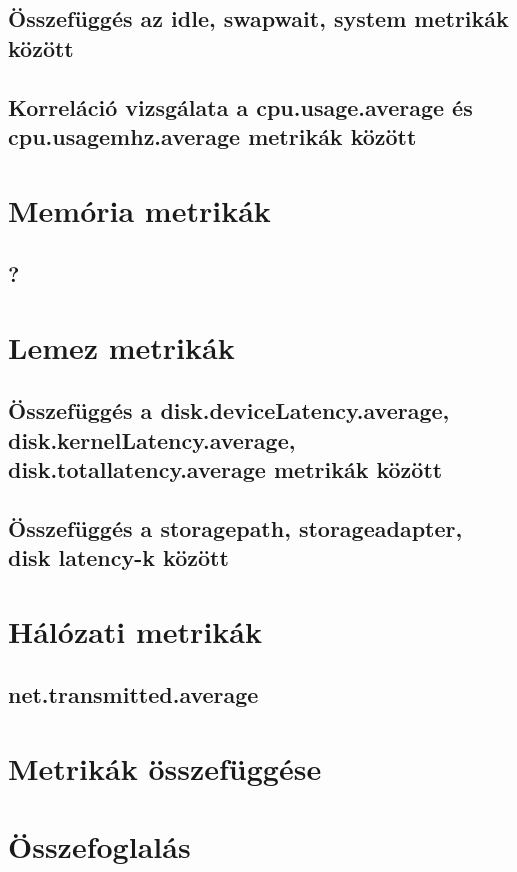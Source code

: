 \documentclass[a4paper,10pt,titlepage]{article}
\begin{document}
\subsection{Összefüggés az idle, swapwait, system metrikák között}
\subsection{Korreláció vizsgálata a cpu.usage.average és cpu.usagemhz.average metrikák között}

\section{Memória metrikák}
\subsection{?}

\section{Lemez metrikák}
\subsection{Összefüggés a disk.deviceLatency.average, disk.kernelLatency.average, \\ disk.totallatency.average metrikák között}
\subsection{Összefüggés a storagepath, storageadapter, disk latency-k között}

\section{Hálózati metrikák}
\subsection{net.transmitted.average}

\section{Metrikák összefüggése}

\section{Összefoglalás}
\end{document}
